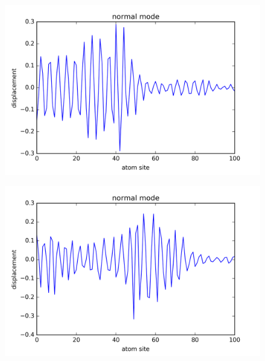 \begin{figure}[!htbh]
\centering
\begin{minipage}{.45\textwidth}
  \centering
  \includegraphics[width=1.1\linewidth]{Harmonic_spring_ratio/prob_spr_N_103sp_2_0p_0_151th.png}
  \label{fig:prob_spring_N_103m_2p_0_1_51st}
\end{minipage}\qquad
\begin{minipage}{.45\textwidth}
  \centering
  \includegraphics[width=1.1\linewidth]{Harmonic_spring_ratio/prob_spr_N_103sp_2_0p_0_551th.png}
  \label{fig:prob_spring_N_103m_2p_0_5_51st}
\end{minipage}
\end{figure}

